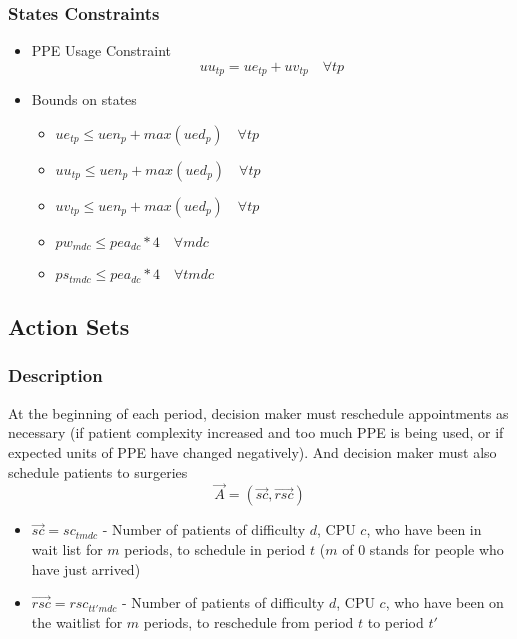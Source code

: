 \documentclass{article}
\begin{document}
\subsubsection{States Constraints}
\begin{itemize}
	\item PPE Usage Constraint
	\begin{equation}
		uu_{tp} = ue_{tp}+uv_{tp} \quad \forall tp
	\end{equation}
	\item Bounds on states
	\begin{itemize}
		\item $ue_{tp} \le uen_{p} + max(ued_p) \quad \forall tp$
		\item $uu_{tp} \le uen_{p} + max(ued_p) \quad \forall tp$
		\item $uv_{tp} \le uen_{p} + max(ued_p) \quad \forall tp$
		\item $pw_{mdc} \le pea_{dc} * 4 \quad \forall mdc$
		\item $ps_{tmdc} \le pea_{dc} * 4 \quad \forall tmdc$
	\end{itemize}
\end{itemize}

\subsection{Action Sets}
\subsubsection{Description}
At the beginning of each period, decision maker must reschedule appointments as necessary (if patient complexity increased and too much PPE is being used, or if expected units of PPE have changed negatively). And decision maker must also schedule patients to surgeries
\[  \vec{A} = (\vec{sc}, \vec{rsc}) \] 
\begin{itemize}
    \item $\vec{sc} = sc_{tmdc}$ - Number of patients of difficulty $d$, CPU $c$, who have been in wait list for $m$ periods, to schedule in period $t$ ($m$ of 0 stands for people who have just arrived)
	\item $\vec{rsc} = rsc_{tt'mdc}$ - Number of patients of difficulty $d$, CPU $c$, who have been on the waitlist for $m$ periods, to reschedule from period $t$ to period $t'$
\end{itemize}
\end{document}
